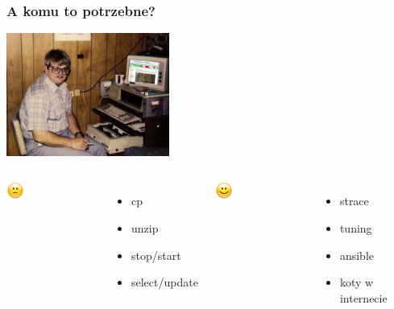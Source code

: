 \documentclass[10pt]{beamer}
\begin{document}
\begin{frame}
\frametitle{A komu to potrzebne?}
\begin{center}
\vskip-0.5cm
\includegraphics[width=0.4\textwidth]{sysadmin.jpg}
\end{center}
\pause
\begin{columns}[t]
\begin{center}
\vskip-1cm
\includegraphics[width=0.2\textwidth]{sad.png}
\end{center}
\begin{itemize}
\item cp
\item unzip
\item stop/start
\item select/update
\end{itemize}
\pause
{}
\begin{center}
\vskip-1cm
\includegraphics[width=0.2\textwidth]{smile.png}
\end{center}
\begin{itemize}
\item strace
\item tuning
\item ansible
\item koty w internecie
\end{itemize}
\end{columns}
\end{frame}
\end{document}

